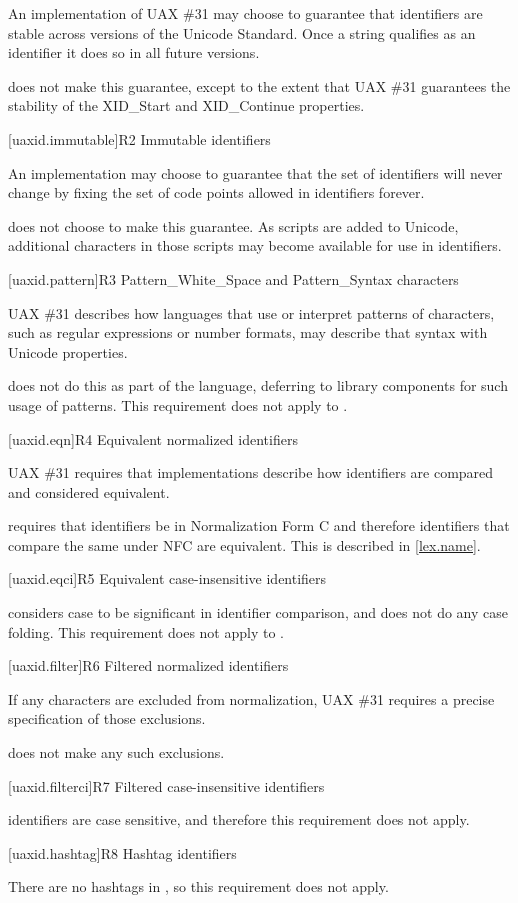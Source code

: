 \pnum
An implementation of UAX \#31 may choose to guarantee
that identifiers are stable across versions of the Unicode Standard.
Once a string qualifies as an identifier it does so in all future versions.

\pnum
\Cpp{} does not make this guarantee,
except to the extent that UAX \#31 guarantees
the stability of the XID_Start and XID_Continue properties.

[uaxid.immutable]{R2 Immutable identifiers}

\pnum
An implementation may choose to guarantee that
the set of identifiers will never change
by fixing the set of code points allowed in identifiers forever.

\pnum
\Cpp{} does not choose to make this guarantee.
As scripts are added to Unicode,
additional characters in those scripts may become available
for use in identifiers.

[uaxid.pattern]{R3 Pattern_White_Space and Pattern_Syntax characters}

\pnum
UAX \#31 describes how languages that use or interpret patterns of characters,
such as regular expressions or number formats,
may describe that syntax with Unicode properties.

\pnum
\Cpp{} does not do this as part of the language,
deferring to library components for such usage of patterns.
This requirement does not apply to \Cpp{}.

[uaxid.eqn]{R4 Equivalent normalized identifiers}

\pnum
UAX \#31 requires that implementations describe
how identifiers are compared and considered equivalent.

\pnum
\Cpp{} requires that identifiers be in Normalization Form C and
therefore identifiers that compare the same under NFC are equivalent.
This is described in \ref{lex.name}.

[uaxid.eqci]{R5 Equivalent case-insensitive identifiers}

\pnum
\Cpp{} considers case to be significant in identifier comparison, and
does not do any case folding.
This requirement does not apply to \Cpp{}.

[uaxid.filter]{R6 Filtered normalized identifiers}

\pnum
If any characters are excluded from normalization,
UAX \#31 requires a precise specification of those exclusions.

\pnum
\Cpp{} does not make any such exclusions.

[uaxid.filterci]{R7 Filtered case-insensitive identifiers}

\pnum
\Cpp{} identifiers are case sensitive, and
therefore this requirement does not apply.

[uaxid.hashtag]{R8 Hashtag identifiers}

\pnum
There are no hashtags in \Cpp{}, so this requirement does not apply.
